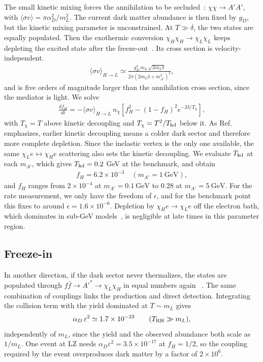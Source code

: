 \documentclass[prd,aps,reprint,superscriptaddress,nofootinbib]{revtex4-2}
\newcommand{\GeV}{~\text{GeV}}
\begin{document}
The small kinetic mixing forces the annihilation to be secluded~\cite{Pospelov:2007mp}: $\chi\chi \to A'A'$, with $\langle\sigma v\rangle = \pi\alpha_D^2/m_L^2$. The current dark matter abundance is then fixed by $g_D$, but the kinetic mixing parameter is unconstrained. At  $T \gg \delta$, the two states are equally populated. Then the exothermic conversion $\chi_H\chi_H\to\chi_L\chi_L$ keeps depleting the excited state after the freeze-out~\cite{Finkbeiner:2009mi,Blennow:2016gde,Bhattiprolu:2023akk}. Its cross section is velocity-independent.
\begin{align}
\langle\sigma v\rangle_{H\to L} \simeq \frac{g_D^4\, m_L\, \sqrt{2m_L\delta}}{2\pi\left(2m_L\delta+m_{A'}^2\right)^2} ,
\label{eq:sconv}
\end{align}
and is five orders of magnitude larger than the annihilation cross section, since the mediator is light. We solve
\begin{align}
\frac{d f_H}{dt} = -\langle\sigma v\rangle_{H\to L}\, n_\chi \left[f_H^2 - (1-f_H)^2 e^{-2\delta/T_\chi}\right] ,
\label{eq:boltz}
\end{align}
with $T_\chi = T$ above kinetic decoupling and $T_\chi = T^2/T_{\rm kd}$ below it. As Ref.~\cite{Finkbeiner:2009mi} emphasizes, earlier kinetic decoupling means a colder dark sector and therefore more complete depletion. Since the inelastic vertex is the only one available, the same $\chi_L e \leftrightarrow \chi_H e$ scattering also sets the kinetic decoupling. We evaluate $T_{\rm kd}$ at each $m_{A'}$, which gives $T_{ \rm kd} = 0.2$ GeV at the benchmark, and obtain
\begin{align}
f_H = 6.2\times 10^{-3} \quad (m_{A'} = 1\GeV) ,
\end{align}
and $f_H$ ranges from $2\times 10^{-4}$ at $m_{A'} = 0.1\GeV$ to $0.28$ at $m_{A'} = 5\GeV$. For the rate measurement, we only have the freedom of $\epsilon$, and for the benchmark point this fixes to around  $\epsilon = 1.6\times 10^{-6}$. Depletion by $\chi_H e \to \chi_L e$ off the electron bath, which dominates in sub-GeV models~\cite{Finkbeiner:2009mi,Bhattiprolu:2023akk}, is negligible at late times in this parameter region.


\subsection{Freeze-in}

In another direction, if the dark sector never thermalizes, the states are populated through $f\bar f \to A'^* \to \chi_L\chi_H$ in equal numbers again~ \cite{Hall:2009bx,Heeba:2023bik}. The same combination of couplings links the production and direct detection. Integrating the collision term with the yield dominated at $T \sim m_L$ gives
\begin{align}
\alpha_D\,\varepsilon^2 \simeq 1.7\times 10^{-23} \qquad (T_{\rm RH} \gg m_L),
\end{align}
independently of $m_L$, since the yield and the observed abundance both scale as $1/m_L$. One event at LZ needs $\alpha_D\varepsilon^2 = 3.5\times 10^{-17}$ at $f_H = 1/2$, so the coupling required by the event overproduces dark matter by a factor of $2\times 10^{6}$.
\end{document}
